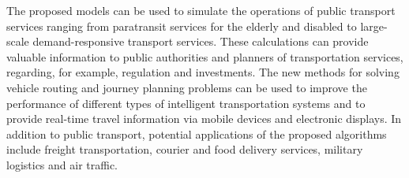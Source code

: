 \documentclass[dissertation,draft*]{aaltoseries}
\begin{document}
The proposed models can be used to simulate the operations of public transport services ranging 
from paratransit services for the elderly and disabled to 
large-scale demand-responsive transport services. These calculations can 
provide valuable information to public authorities and planners of transportation services,
regarding, for example, regulation and investments.
The new methods for solving vehicle routing and journey planning problems can be 
used to improve the performance of different types of intelligent transportation systems and
to provide real-time travel information via mobile devices and electronic displays.
In addition to public transport, potential applications of the proposed algorithms
include freight transportation, courier and food delivery services, military logistics and air traffic.

\end{document}
